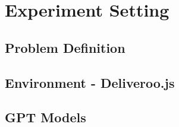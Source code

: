 \chapter{Experiment Setting}
\label{cha:experiment_setting}

\section{Problem Definition}
\label{sec:problem_definition}

\section{Environment - Deliveroo.js}
\label{sec:environment_deliveroo_js}

\section{GPT Models}
\label{sec:gpt_models}
